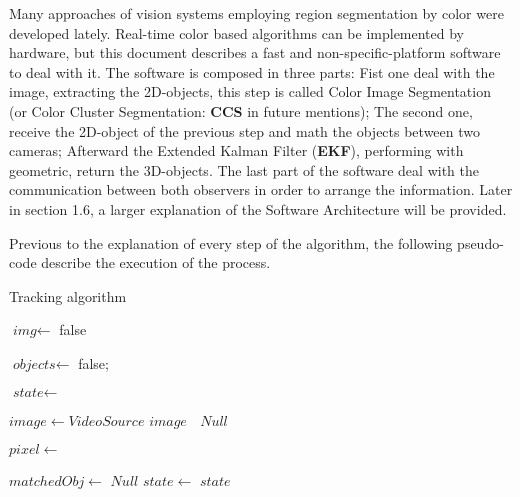 Many approaches of vision systems employing region segmentation \cite{fast_segmentation_Mitra} \cite{fuzzy_segmentation} by color were developed lately. Real-time color based algorithms can be implemented by hardware, but this document describes a fast and non-specific-platform software to deal with it. The software is composed in three parts: Fist one deal with the image, extracting the 2D-objects, this step is called Color Image Segmentation \cite{JamesBruce_CMU_SEG} (or Color Cluster Segmentation: \textbf{CCS} in future mentions); The second one, receive the 2D-object of the previous step and math the objects between two cameras; Afterward the Extended Kalman Filter \cite{GabrielTerejanu_EKF} (\textbf{EKF}), performing with geometric, return the 3D-objects. The last part of the software deal with the communication between both observers in order to arrange the information. Later in section 1.6, a larger explanation of the Software Architecture will be provided.

Previous to the explanation of every step of the algorithm, the following pseudo-code describe the execution of the process.

\begin{algorithm}[ht]
\caption{Tracking algorithm}\label{algorithm_pseudo}
	\begin{algorithmic}[1]
		\State {}
		\State {}
		\State $\textit{img}  \gets$ 
			\State \Return false
		\EndIf
		
		\State $\textit{objects} \gets$ 
			\State \Return false;
		\EndIf
		
		\State $\textit{state} \gets$ 
	\EndProcedure
	
			\State $image \gets VideoSource$
			\Return $image$
		\Else $\;$
			\State \Return $Null$
		\EndIf
		
	\EndProcedure
	
			\State {}
		\EndIf
			\State $pixel \gets$ 
		\EndFor
			\State \Return {}
	\EndProcedure
	
		\State $matchedObj \gets$  
			\State \Return $Null$
		\EndIf
		\State $state \gets$ 
		\State \Return $state$
	\EndProcedure
	
	\end{algorithmic}
\end{algorithm}